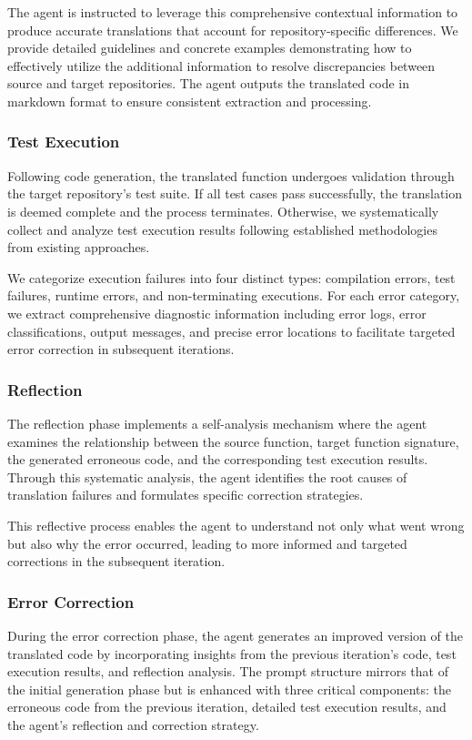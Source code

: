 The agent is instructed to leverage this comprehensive contextual information to produce accurate translations that account for repository-specific differences. We provide detailed guidelines and concrete examples demonstrating how to effectively utilize the additional information to resolve discrepancies between source and target repositories. The agent outputs the translated code in markdown format to ensure consistent extraction and processing.

\subsubsection{Test Execution}
Following code generation, the translated function undergoes validation through the target repository's test suite. If all test cases pass successfully, the translation is deemed complete and the process terminates. Otherwise, we systematically collect and analyze test execution results following established methodologies from existing approaches.

We categorize execution failures into four distinct types: compilation errors, test failures, runtime errors, and non-terminating executions. For each error category, we extract comprehensive diagnostic information including error logs, error classifications, output messages, and precise error locations to facilitate targeted error correction in subsequent iterations.

\subsubsection{Reflection}
The reflection phase implements a self-analysis mechanism where the agent examines the relationship between the source function, target function signature, the generated erroneous code, and the corresponding test execution results. Through this systematic analysis, the agent identifies the root causes of translation failures and formulates specific correction strategies.

This reflective process enables the agent to understand not only what went wrong but also why the error occurred, leading to more informed and targeted corrections in the subsequent iteration.

\subsubsection{Error Correction}
During the error correction phase, the agent generates an improved version of the translated code by incorporating insights from the previous iteration's code, test execution results, and reflection analysis. The prompt structure mirrors that of the initial generation phase but is enhanced with three critical components: the erroneous code from the previous iteration, detailed test execution results, and the agent's reflection and correction strategy.

